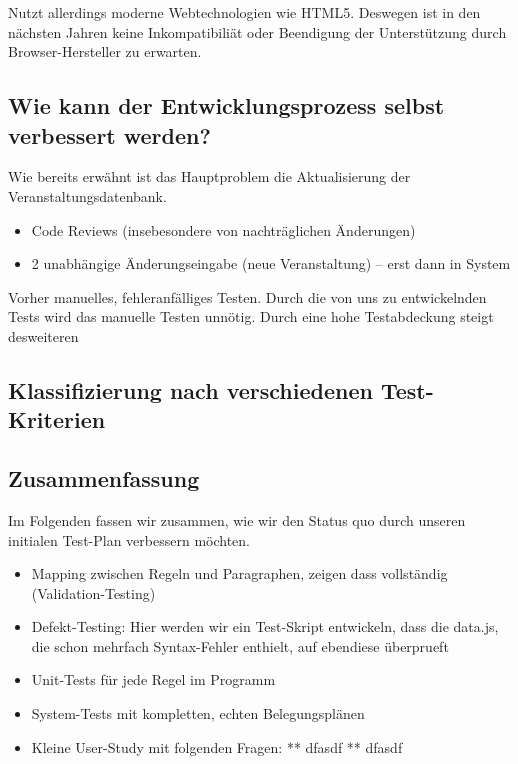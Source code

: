 \documentclass[ngerman]{article}
\begin{document}
 Nutzt allerdings moderne Webtechnologien wie HTML5.
Deswegen ist in den nächsten Jahren keine Inkompatibiliät oder Beendigung der Unterstützung durch Browser-Hersteller zu erwarten.

\subsection{Wie kann der Entwicklungsprozess selbst verbessert werden?}

Wie bereits erwähnt ist das Hauptproblem die Aktualisierung der Veranstaltungsdatenbank.

\begin{itemize}
    \item
        Code Reviews (insebesondere von nachträglichen Änderungen)
    \item
        2 unabhängige Änderungseingabe (neue Veranstaltung) -- erst dann in System
\end{itemize}

Vorher manuelles, fehleranfälliges Testen. Durch die von uns zu
entwickelnden Tests wird das manuelle Testen unnötig. Durch eine hohe
Testabdeckung steigt desweiteren

\subsection{Klassifizierung nach verschiedenen Test-Kriterien}


\subsection{Zusammenfassung}
\label{sec:zusammenfassung}

Im Folgenden fassen wir zusammen, wie wir den Status quo durch unseren initialen Test-Plan verbessern möchten.

\begin{itemize}
    \item Mapping zwischen Regeln und Paragraphen, zeigen dass vollständig (Validation-Testing)
    \item
        Defekt-Testing: Hier werden wir ein Test-Skript entwickeln, dass die data.js, die schon mehrfach Syntax-Fehler enthielt, auf ebendiese überprueft
    \item
        Unit-Tests für jede Regel im Programm
    \item
        System-Tests mit kompletten, echten Belegungsplänen
    \item
        Kleine User-Study mit folgenden Fragen: ** dfasdf ** dfasdf
\end{itemize}
\end{document}
